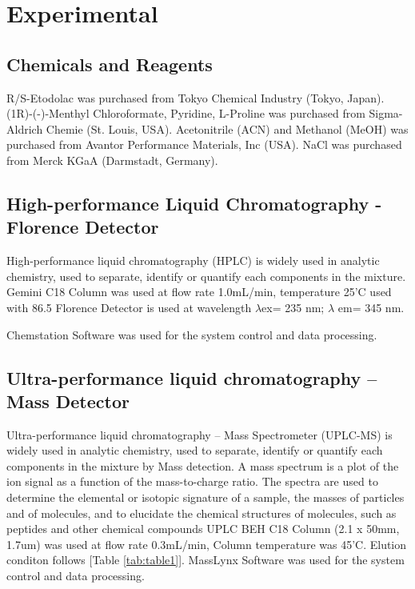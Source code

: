 \documentclass[12pt]{article} %
\begin{document}
\newpage




\section{Experimental}

\subsection{Chemicals and Reagents}
  R/S-Etodolac was purchased from Tokyo Chemical Industry (Tokyo, Japan).
  (1R)-(-)-Menthyl Chloroformate, Pyridine, L-Proline was purchased from Sigma-Aldrich Chemie (St. Louis, USA).
  Acetonitrile (ACN) and Methanol (MeOH) was purchased from Avantor Performance Materials, Inc (USA).
NaCl was purchased from Merck KGaA (Darmstadt, Germany).

\subsection{High-performance Liquid Chromatography - Florence Detector}
  High-performance liquid chromatography (HPLC) is widely used in analytic chemistry, used to separate, identify or quantify each components in the mixture. Gemini C18 Column was used at flow rate 1.0mL/min, temperature 25'C used with 86.5%
  Florence Detector is used at wavelength $\lambda$ex= 235 nm; $\lambda$ em= 345 nm.

  Chemstation Software was used for the system control and data processing.


\subsection{Ultra-performance liquid chromatography – Mass Detector}

  Ultra-performance liquid chromatography – Mass Spectrometer (UPLC-MS) is widely used in analytic chemistry, used to separate, identify or quantify each components in the mixture by Mass detection. A mass spectrum is a plot of the ion signal as a function of the mass-to-charge ratio. The spectra are used to determine the elemental or isotopic signature of a sample, the masses of particles and of molecules, and to elucidate the chemical structures of molecules, such as peptides and other chemical compounds
UPLC BEH C18 Column (2.1 x 50mm, 1.7um) was used at flow rate 0.3mL/min, Column temperature was 45'C. Elution conditon follows [Table \ref{tab:table1}]. MassLynx Software was used for the system control and data processing.
\end{document}
